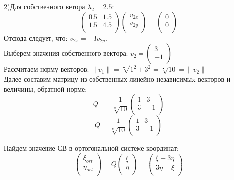 \documentclass{article}
\begin{document}
2)Для собственного ветора $\lambda_{2}=2.5$:\\

$$\left(
  	{\begin{array}{cc}
    		0.5 & 1.5\\
    		1.5 & 4.5\\
  	\end{array}}
\right)
\left(
  	{\begin{array}{c}
    		v_{2x}\\
    		v_{2y}\\
  	\end{array}}
\right)=
\left(
  	{\begin{array}{c}
    		0\\
    		0\\
  	\end{array}}
\right)
$$
Отсюда следует, что: $v_{2x}=-3v_{2y}$.\\
Выберем значения собственного вектора:
$v_{2}=\left(
  	{\begin{array}{c}
    		3\\
    		-1\\
  	\end{array}}
\right)$\\

Рассчитаем норму векторов: $\|v_{1}\|=\sqrt[•]{1^{2}+3^{2}}=\sqrt[•]{10}=\|v_{2}\|$\\

Далее составим матрицу из собственных линейно независимыx векторов и величины, обратной норме:\\
$$Q^\top=\frac{1}{\sqrt[•]{10}}
\left(
  	{\begin{array}{cc}
    		1 & 3\\
    		3 & -1\\
  	\end{array}}
\right)$$
$$Q=\frac{1}{\sqrt[•]{10}}
\left(
  	{\begin{array}{cc}
    		1 & 3\\
    		3 & -1\\
  	\end{array}}
\right)$$

Найдем значение СВ в ортогональной системе координат:
$$\left(
  	{\begin{array}{c}
    		\xi_{ort}\\
    		\eta_{ort}\\
  	\end{array}}
\right)=Q
\left(
  	{\begin{array}{c}
    		\xi\\
    		\eta\\
  	\end{array}}
\right)=
\left(
  	{\begin{array}{c}
    		\xi+3\eta\\
    		3\eta-\xi\\
  	\end{array}}
\right)$$
\end{document}
